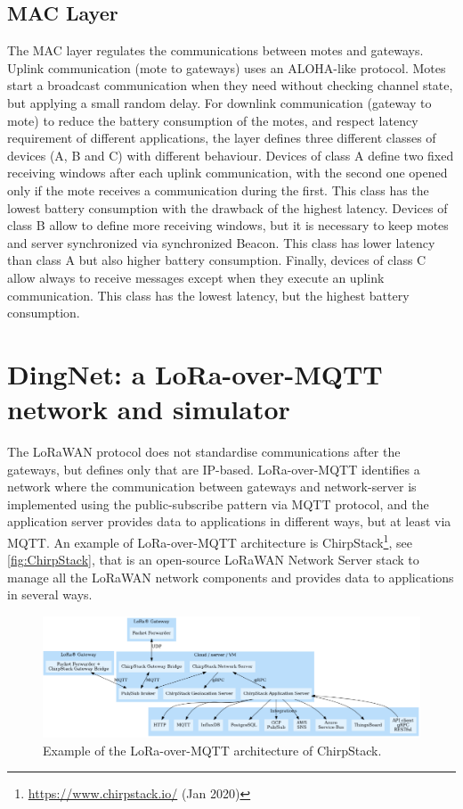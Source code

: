 \subsection{MAC Layer}
The MAC layer regulates the communications between motes and gateways.
% 
Uplink communication (mote to gateways) uses an ALOHA-like protocol. Motes start a broadcast communication when they need without checking channel state, but applying a small random delay.
% 
For downlink communication (gateway to mote) to reduce the battery consumption of the motes, and respect latency requirement of different applications, the layer defines three different classes of devices (A, B and C) with different behaviour.
% 
Devices of class A define two fixed receiving windows after each uplink communication, with the second one opened only if the mote receives a communication during the first. 
% 
This class has the lowest battery consumption with the drawback of the highest latency. 
% 
Devices of class B allow to define more receiving windows, but it is necessary to keep motes and server synchronized via synchronized Beacon. 
% 
This class has lower latency than class A but also higher battery consumption. 
% 
Finally, devices of class C allow always to receive messages except when they execute an uplink communication. 
% 
This class has the lowest latency, but the highest battery consumption.

\section{DingNet: a LoRa-over-MQTT network and simulator}
\label{sec:DingNet}
The LoRaWAN protocol does not standardise communications after the gateways, but defines only that are IP-based.
% 
LoRa-over-MQTT identifies a network where the communication between gateways and network-server is implemented using the public-subscribe pattern via MQTT protocol, and the application server provides data to applications in different ways, but at least via MQTT.
% 
An example of LoRa-over-MQTT architecture is ChirpStack\footnote{\href{https://www.chirpstack.io/}{https://www.chirpstack.io/} (Jan 2020)}, see \autoref{fig:ChirpStack}, that is an open-source LoRaWAN Network Server stack to manage all the LoRaWAN network components and provides data to applications in several ways.

\begin{figure}[h]
    \centering
    \includegraphics[width=\textwidth]{figures/chirpstack.png}
    \caption[LoRa-over-MQTT architecture]{Example of the LoRa-over-MQTT architecture of ChirpStack.~\cite{chirpstack2020}}
    \label{fig:ChirpStack}
\end{figure}

